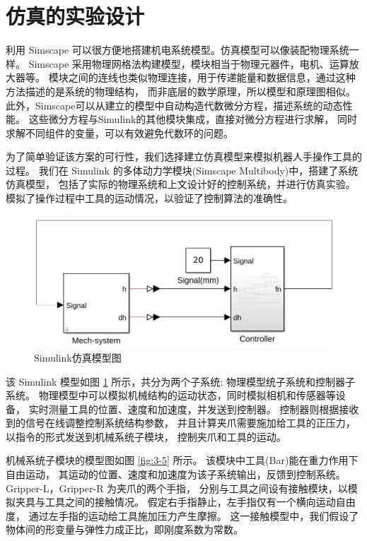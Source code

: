 \section{仿真的实验设计}
利用 Simscape 可以很方便地搭建机电系统模型。仿真模型可以像装配物理系统一样。
Simscape 采用物理网格法构建模型，模块相当于物理元器件，电机、运算放大器等。
模块之间的连线也类似物理连接，用于传递能量和数据信息，通过这种方法描述的是系统的物理结构，
而非底层的数学原理，所以模型和原理图相似。
此外，Simscape可以从建立的模型中自动构造代数微分方程，描述系统的动态性能。
这些微分方程与Simulink的其他模块集成，直接对微分方程进行求解，
同时求解不同组件的变量，可以有效避免代数环的问题。

为了简单验证该方案的可行性，我们选择建立仿真模型来模拟机器人手操作工具的过程。
我们在 Simulink 的多体动力学模块(Simscape Multibody)中，搭建了系统仿真模型，
包括了实际的物理系统和上文设计好的控制系统，并进行仿真实验。
模拟了操作过程中工具的运动情况，以验证了控制算法的准确性。

\begin{figure}[!ht]
  \centering
  \includegraphics[scale=0.60]{chapter03/pic/3-4}
  \caption{Simulink仿真模型图}
  \label{fig:3-4}
  \vspace{-0.3cm}
\end{figure}

该 Simulink 模型如图 \ref{fig:3-4} 所示，共分为两个子系统:
物理模型统子系统和控制器子系统。
物理模型中可以模拟机械结构的运动状态，同时模拟相机和传感器等设备，
实时测量工具的位置、速度和加速度，并发送到控制器。
控制器则根据接收到的信号在线调整控制系统结构参数，
并且计算夹爪需要施加给工具的正压力，以指令的形式发送到机械系统子模块，
控制夹爪和工具的运动。

机械系统子模块的模型图如图 \ref{fig:3-5} 所示。
该模块中工具(Bar)能在重力作用下自由运动，
其运动的位置、速度和加速度为该子系统输出，反馈到控制系统。
Gripper-L，Gripper-R 为夹爪的两个手指，
分别与工具之间设有接触模块，以模拟夹具与工具之间的接触情况。
假定右手指静止，左手指仅有一个横向运动自由度，
通过左手指的运动给工具施加压力产生摩擦。
这一接触模型中，我们假设了物体间的形变量与弹性力成正比，即刚度系数为常数。

